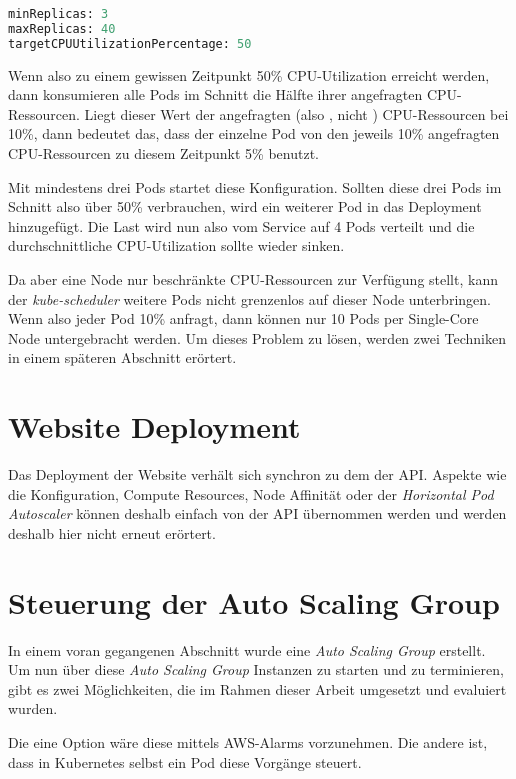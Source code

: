 \begin{lstlisting}[language=Python,numbers=none]
minReplicas: 3
maxReplicas: 40
targetCPUUtilizationPercentage: 50\end{lstlisting}

Wenn also zu einem gewissen Zeitpunkt 50\% CPU-Utilization erreicht werden,
dann konsumieren alle Pods im Schnitt die Hälfte ihrer angefragten
CPU-Ressourcen.
Liegt dieser Wert der angefragten (also , nicht ) CPU-Ressourcen
bei 10\%, dann bedeutet das,
dass der einzelne Pod von den jeweils 10\% angefragten CPU-Ressourcen
zu diesem Zeitpunkt 5\% benutzt.

Mit mindestens drei Pods startet diese Konfiguration. Sollten diese drei Pods
im Schnitt also über 50\% verbrauchen, wird ein weiterer Pod in das Deployment
hinzugefügt. Die Last wird nun also vom Service auf 4 Pods verteilt und die
durchschnittliche CPU-Utilization sollte wieder sinken.

Da aber eine Node nur beschränkte CPU-Ressourcen zur Verfügung stellt,
kann der \emph{kube-scheduler} weitere Pods nicht grenzenlos auf dieser Node unterbringen.
Wenn also jeder Pod 10\% anfragt, dann können nur 10 Pods per Single-Core Node
untergebracht werden. Um dieses Problem zu lösen, werden zwei
Techniken in einem späteren Abschnitt erörtert.

\section{Website Deployment}

Das Deployment der Website verhält sich synchron zu dem der API.
Aspekte wie die Konfiguration, Compute Resources, Node Affinität oder
der \emph{Horizontal Pod Autoscaler} können deshalb einfach von der API übernommen
werden und werden deshalb hier nicht erneut erörtert.

\section{Steuerung der Auto Scaling Group}

In einem voran gegangenen Abschnitt wurde eine \emph{Auto Scaling Group} erstellt.
Um nun über diese \emph{Auto Scaling Group} Instanzen zu starten und zu terminieren,
gibt es zwei Möglichkeiten, die im Rahmen dieser Arbeit umgesetzt
und evaluiert wurden.

Die eine Option wäre diese mittels AWS-Alarms vorzunehmen. Die andere ist, dass
in Kubernetes selbst ein Pod diese Vorgänge steuert.

